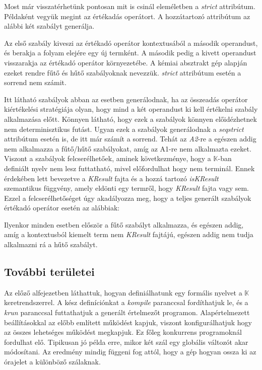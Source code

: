 Most már visszatérhetünk pontosan mit is csinál eleméletben a \textit{strict} attribútum. Példaként vegyük megint az értékadás operátort. A hozzátartozó attribútum az alábbi két szabályt generálja.



Az első szabály kiveszi az értékadó operátor kontextusából a második operandust, és berakja a folyam elejére egy új termként. A második pedig a kivett operandust visszarakja az értékadó operátor környezetébe. A kémiai absztrakt gép alapján ezeket rendre fűtő és hűtő szabályoknak nevezzük. \textit{strict} attribútum esetén a sorrend nem számit.



Itt látható szabályok abban az esetben generálodnak, ha az összeadás operátor kiértékelési stratégiája olyan, hogy mind a két operandust ki kell értékelni szabály alkalmazása előtt. Könnyen látható, hogy ezek a szabályok könnyen előidézhetnek nem determinisztikus futást. Ugyan ezek a szabályok generálodnak a \textit{seqstrict} attribútum esetén is, de itt már számít a sorrend. Tehát az \textit{A2}-re a egészen addig nem alkalmazza a fűtő/hűtő szabályokat, amíg az A1-re nem alkalmazta ezeket. Viszont a szabályok felcserélhetőek, aminek következménye, hogy a $\mathbb{K}$-ban definiált nyelv nem lesz futtatható, mivel előfordulhat hogy nem terminál. Ennek érdekében lett bevezetve a \textit{KResult} fajta és a hozzá tartozó \textit{isKResult} szemantikus függvény, amely eldönti egy termről, hogy \textit{KResult} fajta vagy sem. Ezzel a felcserélhetőséget úgy akadályozza meg, hogy a teljes generált szabályok értékadó operátor esetén az alábbiak:



Ilyenkor minden esetben először a fűtő szabályt alkalmazza, és egészen addig, amíg a kontextusból kiemelt term nem \textit{KResult} fajtájú, egészen addig nem tudja alkalmazni rá a hűtő szabályt.

\subsection{További területei}

Az előző alfejezetben láthattuk, hogyan definiálhatunk egy formális nyelvet a $\mathbb{K}$ keretrendszerrel. A kész definíciónkat a \textit{kompile} paranccsal fordíthatjuk le, és a \textit{krun} paranccsal futtathatjuk a generált értelmezőt programon. Alapértelmezett beállításokkal az előbb említett működést kapjuk, viszont konfigurálhatjuk hogy az összes lehetséges működést megkapjuk. Ez főleg konkurrens programoknál fordulhat elő. Tipikusan jó példa erre, mikor két szál egy globális változót akar módosítani. Az eredmény mindig függeni fog attól, hogy a gép hogyan ossza ki az órajelet a különböző szálaknak.

